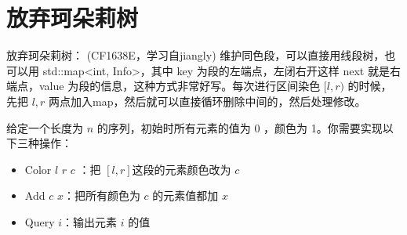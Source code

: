 \section{放弃珂朵莉树}
\par \noindent 放弃珂朵莉树： (CF1638E，学习自jiangly) 维护同色段，可以直接用线段树，也可以用 std::map<int, Info>，其中 key 为段的左端点，左闭右开这样 next 就是右端点，value 为段的信息，这种方式非常好写。每次进行区间染色 $[l,r)$ 的时候，先把 $l,r$ 两点加入map，然后就可以直接循环删除中间的，然后处理修改。
\begin{tcolorbox}
\par \noindent 给定一个长度为 $n$ 的序列，初始时所有元素的值为 0 ，颜色为 1。你需要实现以下三种操作：
\begin{itemize}
\item Color $l$ $r$ $c$ ：把 $[l,r]$这段的元素颜色改为 $c$
\item Add $c$ $x$：把所有颜色为 $c$ 的元素值都加 $x$
\item Query $i$：输出元素 $i$ 的值
\end{itemize}
\end{tcolorbox}
